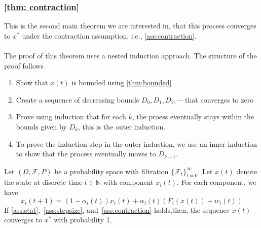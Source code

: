 \subsubsection{\autoref{thm: contraction}}
This is the second main theorem we are interested in, that this process converges to $x^*$ under the contraction assumption, i.e., \autoref{ass:contraction}.\\
\\
The proof of this theorem uses a nested induction approach. The structure of the proof follows
\begin{enumerate}
    \item Show that $x(t)$ is bounded using \autoref{thm:bounded}
    \item Create a sequence of decreasing bounds $D_0, D_1, D_2,\cdots$ that converges to zero
    \item Prove using induction that for each $k$, the proess eventually stays within the bounds given by $D_k$, this is the outer induction.
    \item To prove the induction step in the outer induction, we use an inner induction to show that the process eventually moves to $D_{k+1}$.
\end{enumerate}
\begin{theorem}\label{thm: contraction}
Let $(\Omega, \mathcal{F},P)$ be a probability space with filtration $\{\mathcal{F}_t\}_{t=0}^\infty$. Let $x(t)$ denote the state at discrete time $t\in\mathbb{N}$ with component $x_i(t)$. For each component, we have
$$
x_i(t+1) = (1-\alpha_i(t))x_i(t) + \alpha_i(t)(F_i(x(t)) + w_i(t)) 
$$
If \autoref{ass:stat},~\ref{ass:stepsize}, and~\ref{ass:contraction} holds,then, the sequence $x(t)$ converges to $x^*$ with probability 1.
\end{theorem}
